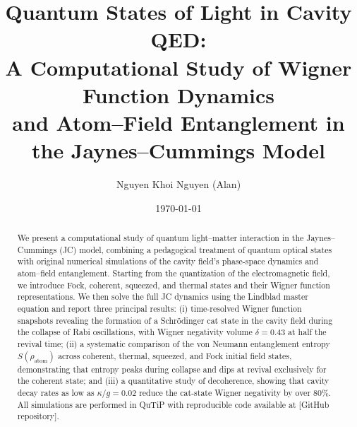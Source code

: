 \documentclass[%
 reprint,
 amsmath,amssymb,
 aps,
]{revtex4-2}
\begin{document}

\title{Quantum States of Light in Cavity QED:\\A Computational Study of Wigner Function Dynamics\\and Atom--Field Entanglement in the Jaynes--Cummings Model}

\author{Nguyen Khoi Nguyen (Alan)}

\date{\today}

\begin{abstract}
We present a computational study of quantum light--matter interaction in the Jaynes--Cummings (JC) model, combining a pedagogical treatment of quantum optical states with original numerical simulations of the cavity field's phase-space dynamics and atom--field entanglement. Starting from the quantization of the electromagnetic field, we introduce Fock, coherent, squeezed, and thermal states and their Wigner function representations. We then solve the full JC dynamics using the Lindblad master equation and report three principal results: (i) time-resolved Wigner function snapshots revealing the formation of a Schr\"{o}dinger cat state in the cavity field during the collapse of Rabi oscillations, with Wigner negativity volume $\delta = 0.43$ at half the revival time; (ii) a systematic comparison of the von Neumann entanglement entropy $S(\rho_{\text{atom}})$ across coherent, thermal, squeezed, and Fock initial field states, demonstrating that entropy peaks during collapse and dips at revival exclusively for the coherent state; and (iii) a quantitative study of decoherence, showing that cavity decay rates as low as $\kappa/g = 0.02$ reduce the cat-state Wigner negativity by over 80\%. All simulations are performed in QuTiP with reproducible code available at [GitHub repository].
\end{abstract}


\maketitle

\end{document}
